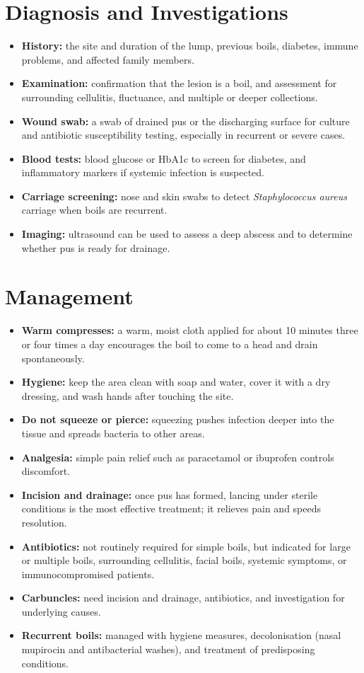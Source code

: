 \section*{Diagnosis and Investigations}
\begin{itemize}
    \item \textbf{History:} the site and duration of the lump, previous boils, diabetes, immune problems, and affected family members.
    \item \textbf{Examination:} confirmation that the lesion is a boil, and assessment for surrounding cellulitis, fluctuance, and multiple or deeper collections.
    \item \textbf{Wound swab:} a swab of drained pus or the discharging surface for culture and antibiotic susceptibility testing, especially in recurrent or severe cases.
    \item \textbf{Blood tests:} blood glucose or HbA1c to screen for diabetes, and inflammatory markers if systemic infection is suspected.
    \item \textbf{Carriage screening:} nose and skin swabs to detect \textit{Staphylococcus aureus} carriage when boils are recurrent.
    \item \textbf{Imaging:} ultrasound can be used to assess a deep abscess and to determine whether pus is ready for drainage.
\end{itemize}

\section*{Management}
\begin{itemize}
    \item \textbf{Warm compresses:} a warm, moist cloth applied for about 10 minutes three or four times a day encourages the boil to come to a head and drain spontaneously.
    \item \textbf{Hygiene:} keep the area clean with soap and water, cover it with a dry dressing, and wash hands after touching the site.
    \item \textbf{Do not squeeze or pierce:} squeezing pushes infection deeper into the tissue and spreads bacteria to other areas.
    \item \textbf{Analgesia:} simple pain relief such as paracetamol or ibuprofen controls discomfort.
    \item \textbf{Incision and drainage:} once pus has formed, lancing under sterile conditions is the most effective treatment; it relieves pain and speeds resolution.
    \item \textbf{Antibiotics:} not routinely required for simple boils, but indicated for large or multiple boils, surrounding cellulitis, facial boils, systemic symptoms, or immunocompromised patients.
    \item \textbf{Carbuncles:} need incision and drainage, antibiotics, and investigation for underlying causes.
    \item \textbf{Recurrent boils:} managed with hygiene measures, decolonisation (nasal mupirocin and antibacterial washes), and treatment of predisposing conditions.
\end{itemize}

